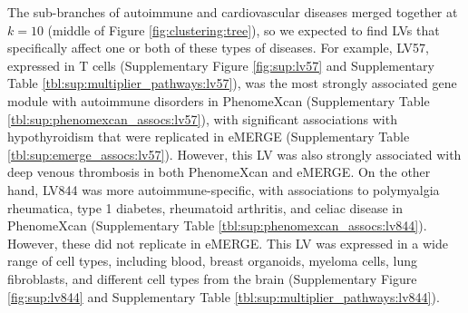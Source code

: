 \documentclass[
  a4paper,
]{article}
\begin{document}
The sub-branches of autoimmune and cardiovascular diseases merged together at \(k=10\) (middle of Figure \ref{fig:clustering:tree}), so we expected to find LVs that specifically affect one or both of these types of diseases.
For example, LV57, expressed in T cells (Supplementary Figure \ref{fig:sup:lv57} and Supplementary Table \ref{tbl:sup:multiplier_pathways:lv57}), was the most strongly associated gene module with autoimmune disorders in PhenomeXcan (Supplementary Table \ref{tbl:sup:phenomexcan_assocs:lv57}), with significant associations with hypothyroidism that were replicated in eMERGE (Supplementary Table \ref{tbl:sup:emerge_assocs:lv57}).
However, this LV was also strongly associated with deep venous thrombosis in both PhenomeXcan and eMERGE.
On the other hand, LV844 was more autoimmune-specific, with associations to polymyalgia rheumatica, type 1 diabetes, rheumatoid arthritis, and celiac disease in PhenomeXcan (Supplementary Table \ref{tbl:sup:phenomexcan_assocs:lv844}).
However, these did not replicate in eMERGE.
This LV was expressed in a wide range of cell types, including blood, breast organoids, myeloma cells, lung fibroblasts, and different cell types from the brain (Supplementary Figure \ref{fig:sup:lv844} and Supplementary Table \ref{tbl:sup:multiplier_pathways:lv844}).
\end{document}
